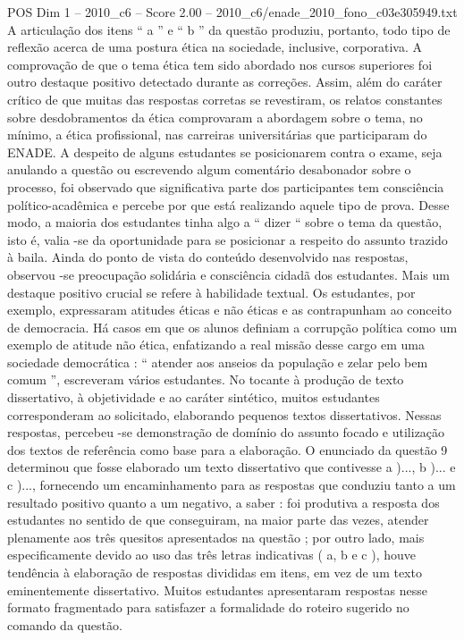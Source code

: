 \begin{textsample}{POS Dim 1 – 2010\_c6 – Score 2.00 – 2010\_c6/enade\_2010\_fono\_c03e305949.txt}
A articulação dos itens “ a ” e “ b ” da questão produziu, portanto, todo tipo de reflexão acerca de uma postura ética na sociedade, inclusive, corporativa.
A comprovação de que o tema ética tem sido abordado nos cursos superiores foi outro destaque positivo detectado durante as correções.
Assim, além do caráter crítico de que muitas das respostas corretas se revestiram, os relatos constantes sobre desdobramentos da ética comprovaram a abordagem sobre o tema, no mínimo, a ética profissional, nas carreiras universitárias que participaram do ENADE.
A despeito de alguns estudantes se posicionarem contra o exame, seja anulando a questão ou escrevendo algum comentário desabonador sobre o processo, foi observado que significativa parte dos participantes tem consciência político-acadêmica e percebe por que está realizando aquele tipo de prova.
Desse modo, a maioria dos estudantes tinha algo a “ dizer “ sobre o tema da questão, isto é, valia -se da oportunidade para se posicionar a respeito do assunto trazido à baila.
Ainda do ponto de vista do conteúdo desenvolvido nas respostas, observou -se preocupação solidária e consciência cidadã dos estudantes.
Mais um destaque positivo crucial se refere à habilidade textual.
Os estudantes, por exemplo, expressaram atitudes éticas e não éticas e as contrapunham ao conceito de democracia.
Há casos em que os alunos definiam a corrupção política como um exemplo de atitude não ética, enfatizando a real missão desse cargo em uma sociedade democrática : “ atender aos anseios da população e zelar pelo bem comum ”, escreveram vários estudantes.
No tocante à produção de texto dissertativo, à objetividade e ao caráter sintético, muitos estudantes corresponderam ao solicitado, elaborando pequenos textos dissertativos.
Nessas respostas, percebeu -se demonstração de domínio do assunto focado e utilização dos textos de referência como base para a elaboração.
O enunciado da questão 9 determinou que fosse elaborado um texto dissertativo que contivesse a )..., b )... e c )..., fornecendo um encaminhamento para as respostas que conduziu tanto a um resultado positivo quanto a um negativo, a saber : foi produtiva a resposta dos estudantes no sentido de que conseguiram, na maior parte das vezes, atender plenamente aos três quesitos apresentados na questão ; por outro lado, mais especificamente devido ao uso das três letras indicativas ( a, b e c ), houve tendência à elaboração de respostas divididas em itens, em vez de um texto eminentemente dissertativo.
Muitos estudantes apresentaram respostas nesse formato fragmentado para satisfazer a formalidade do roteiro sugerido no comando da questão.

\end{textsample}
